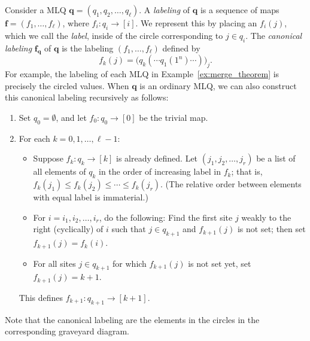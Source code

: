 \documentclass[reqno]{amsart}
\newcommand{\0}{\phantom{c}}
\newcommand{\ff}{\mathbf{f}}
\newcommand{\qq}{\mathbf{q}}
\newcommand{\tup}[1]{\left( #1 \right)}
\newcommand{\ive}[1]{\left[ #1 \right]}
\newcommand{\defn}[1]{{\color{darkred}\emph{#1}}} %
\theoremstyle{plain}
\theoremstyle{definition}
\numberwithin{equation}{section}
\begin{document}
Consider a MLQ $\qq = (q_1, q_2, \dotsc, q_{\ell})$.
A \defn{labeling} of $\qq$ is a sequence of maps $\ff = (f_1, \dotsc, f_{\ell})$, where $f_i \colon q_i \to \ive{i}$.
We represent this by placing an $f_i(j)$, which we call the \defn{label}, inside of the circle corresponding to $j \in q_i$.
The \defn{canonical labeling} $\ff_{\qq}$ of $\qq$ is the labeling $(f_1, \dotsc, f_{\ell})$ defined by
\begin{equation}
f_k(j) = \bigl( q_k( \cdots q_1(1^n) \cdots ) \bigr)_j.
\label{eq.AasLin-lab.formula}
\end{equation}
For example, the labeling of each MLQ in Example~\ref{ex:merge_theorem} is precisely the circled values.
When $\qq$ is an ordinary MLQ, we can also construct this canonical labeling recursively as follows:
\begin{enumerate}
\item Set $q_0 = \emptyset$, and let $f_0 : q_0 \to \ive{0}$ be the trivial map.
\item For each $k = 0, 1, \ldots, \ell-1$:
\begin{itemize}
\item Suppose $f_k \colon q_k \to \ive{k}$ is already defined. Let $\tup{j_1, j_2, \ldots, j_r}$ be a list of all elements of $q_k$ in the order of increasing label in $f_k$; that is, $f_k(j_1) \leq f_k(j_2) \leq \cdots \leq f_k(j_r)$.
      (The relative order between elements with equal label is immaterial.)
\item For $i = i_1, i_2, \ldots, i_r$, do the following:
      Find the first site $j$ weakly to the right (cyclically) of $i$ such that $j \in q_{k+1}$ and $f_{k+1}(j)$ is not set; then set $f_{k+1}(j) = f_k(i)$.
\item For all sites $j \in q_{k+1}$ for which $f_{k+1}(j)$ is not set yet, set $f_{k+1}(j) = k+1$.
\end{itemize}
This defines $f_{k+1} \colon q_{k+1} \to \ive{k+1}$.
\end{enumerate}
Note that the canonical labeling are the elements in the circles in the corresponding graveyard diagram.
\end{document}
